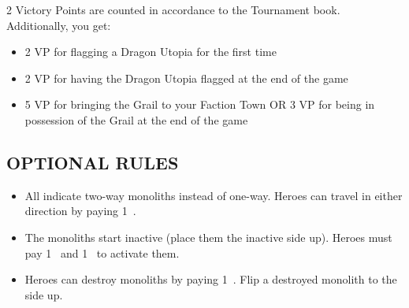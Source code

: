 \begin{multicols}{2}
\columnbreak
Victory Points are counted in accordance to the Tournament book. Additionally, you get:
\begin{itemize}
  \item 2 VP for flagging a Dragon Utopia for the first time
  \item 2 VP for having the Dragon Utopia flagged at the end of the game
  \item 5 VP for bringing the Grail to your Faction Town OR 3 VP for being in possession of the Grail at the end of the game
\end{itemize}

\subsection*{\MakeUppercase{Optional Rules}}
\begin{itemize}
  \item All  indicate two-way monoliths instead of one-way.
    Heroes can travel in either direction by paying 1~.
  \item The monoliths start inactive (place them the inactive  side up).
    Heroes must pay 1~ and 1~ to activate them.
  \item Heroes can destroy monoliths by paying 1~.
    Flip a destroyed monolith to the  side up.
\end{itemize}

\end{multicols}

\vspace*{-8em}

